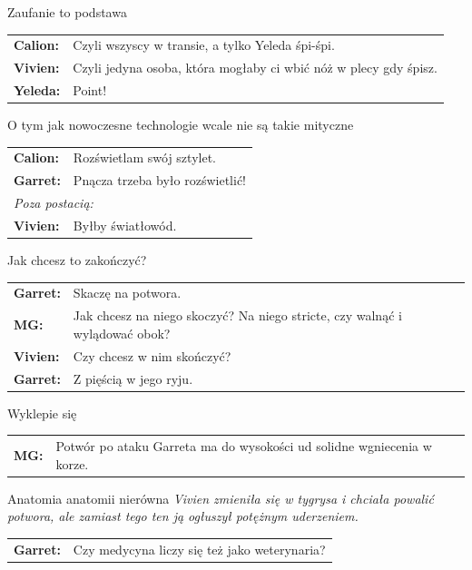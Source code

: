 \documentclass[10pt,twoside,twocolumn]{book}
\begin{document}
\begin{rpg-quotebox}{Zaufanie to podstawa}
   \begin{tabularx}{\columnwidth}{lX}
      \textbf{Calion:} & Czyli wszyscy w transie, a tylko Yeleda śpi-śpi.\\
      \textbf{Vivien:} & Czyli jedyna osoba, która mogłaby ci wbić nóż w plecy gdy śpisz.\\
      \textbf{Yeleda:} & Point!\\
   \end{tabularx}
\end{rpg-quotebox}

\begin{rpg-quotebox}{O tym jak nowoczesne technologie wcale nie są takie mityczne}
   \begin{tabularx}{\columnwidth}{lX}
      \textbf{Calion:} & Rozświetlam swój sztylet.\\
      \textbf{Garret:} & Pnącza trzeba było rozświetlić!\\
      \multicolumn{2}{l}{\textit{Poza postacią:}}\\
      \textbf{Vivien:} & Byłby światłowód.\\
   \end{tabularx}
\end{rpg-quotebox}

\begin{rpg-quotebox}{Jak chcesz to zakończyć?}
   \begin{tabularx}{\columnwidth}{lX}
      \textbf{Garret:} & Skaczę na potwora.\\
      \textbf{MG:} & Jak chcesz na niego skoczyć? Na niego stricte, czy walnąć i wylądować obok?\\
      \textbf{Vivien:} & Czy chcesz w nim skończyć?\\
      \textbf{Garret:} & Z pięścią w jego ryju.\\
   \end{tabularx}
\end{rpg-quotebox}

\begin{rpg-quotebox}{Wyklepie się}
   \begin{tabularx}{\columnwidth}{lX}
      \textbf{MG:} & Potwór po ataku Garreta ma do wysokości ud solidne wgniecenia w korze.\\
   \end{tabularx}
\end{rpg-quotebox}

\begin{rpg-quotebox}{Anatomia anatomii nierówna}
   \textit{Vivien zmieniła się w tygrysa i chciała powalić potwora, ale zamiast tego ten ją ogłuszył potężnym uderzeniem.}\\

   \begin{tabularx}{\columnwidth}{lX}
      \textbf{Garret:} & Czy medycyna liczy się też jako weterynaria?\\
   \end{tabularx}
\end{rpg-quotebox}
\end{document}
